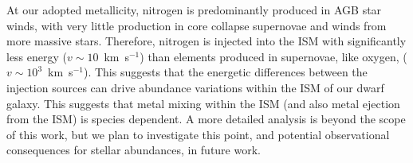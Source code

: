 \documentclass[twocolumn]{aastex61}
\begin{document}
At our adopted metallicity, nitrogen is predominantly produced in AGB star winds, with very little production in core collapse supernovae and winds from more massive stars. Therefore, nitrogen is injected into the ISM with significantly less energy ($v \sim 10$~km~s$^{-1}$) than elements produced in supernovae, like oxygen, ($v\sim 10^3$~km~s$^{-1}$). This suggests that the energetic differences between the injection sources can drive abundance variations within the ISM of our dwarf galaxy. 
   This suggests
that metal mixing within the ISM (and also metal ejection from the ISM) 
is species dependent. A more detailed analysis is beyond the scope of this work, but we plan to investigate this point, and potential observational consequences for stellar abundances, in future work. 


\end{document}
